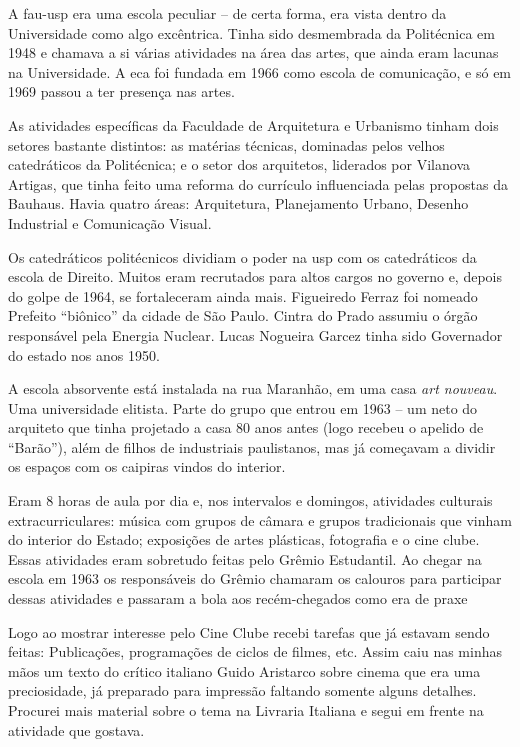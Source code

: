 A {\sc fau-usp} era uma escola peculiar -- de certa forma, era vista dentro da
Universidade como algo excêntrica. Tinha sido desmembrada da Politécnica
em 1948 e chamava a si várias atividades na área das artes, que ainda
eram lacunas na Universidade. A {\sc eca} foi fundada em 1966 como escola de
comunicação, e só em 1969 passou a ter presença nas artes.

As atividades específicas da Faculdade de Arquitetura e
Urbanismo tinham dois setores bastante distintos: as matérias técnicas,
dominadas pelos velhos catedráticos da Politécnica; e o setor dos arquitetos,
liderados por Vilanova Artigas, que tinha feito uma reforma do currículo
influenciada pelas propostas da Bauhaus. Havia quatro áreas: Arquitetura,
Planejamento Urbano, Desenho Industrial e Comunicação Visual.

Os catedráticos politécnicos dividiam o poder na {\sc usp} com os catedráticos
da escola de Direito. Muitos eram recrutados para altos cargos no
governo e, depois do golpe de 1964, se fortaleceram ainda mais. Figueiredo
Ferraz foi nomeado Prefeito “biônico” da cidade de São Paulo. Cintra do
Prado assumiu o órgão responsável pela Energia Nuclear. Lucas
Nogueira Garcez tinha sido Governador do estado nos anos 1950.

A escola absorvente está instalada na rua Maranhão, em uma casa {\it art
nouveau}. Uma universidade elitista. Parte do grupo que entrou em 1963 -- um
neto do arquiteto que tinha projetado a casa 80 anos antes (logo recebeu
o apelido de “Barão”), além de filhos de industriais paulistanos, mas já
começavam a dividir os espaços com os caipiras vindos do interior.

Eram 8 horas de aula por dia e, nos intervalos e domingos, atividades
culturais extracurriculares: música com grupos de câmara e grupos
tradicionais que vinham do interior do Estado; exposições de artes
plásticas, fotografia e o cine clube. Essas atividades eram sobretudo
feitas pelo Grêmio Estudantil. Ao chegar na escola em 1963 os
responsáveis do Grêmio chamaram os calouros para participar dessas
atividades e passaram a bola aos recém-chegados como era de praxe

Logo ao mostrar interesse pelo Cine Clube recebi tarefas que já estavam
sendo feitas: Publicações, programações de ciclos de filmes, etc. Assim
caiu nas minhas mãos um texto do crítico italiano Guido Aristarco sobre
cinema que era uma preciosidade, já preparado para impressão faltando
somente alguns detalhes. Procurei mais material sobre o tema na Livraria
Italiana e segui em frente na atividade que gostava.

